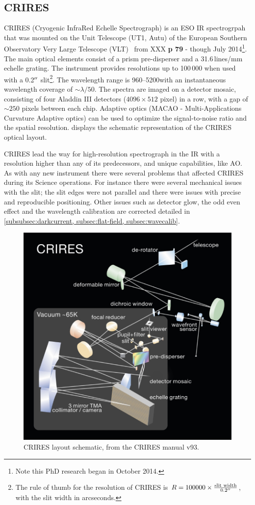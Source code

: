 \subsection{CRIRES}
CRIRES (Cryogenic InfraRed Echelle Spectrograph) is an ESO IR spectrogrpah that was mounted on the Unit Telescope (UT1, Autu) of the European Southern Observatory Very Large Telescope (VLT)~\citep{kaeufl 2004 } from XXX \textbf{p 79} - though July 2014\footnote{Note this PhD research began in October 2014.}.
The main optical elements consist of a prism pre-disperser and a 31.6\,lines/mm echelle grating.
The instrument provides resolutions up to 100\,000 when used with a 0.2$^{\prime\prime}$ slit\footnote{The rule of thumb for the resolution of CRIRES is \(R = 100000 \times \frac{\textrm{slit width}}{0.2^{\prime\prime}}\), with the slit width in arcseconds.}.
The wavelength range is 960--5200\nm with an instantaneous wavelength coverage of \(\sim \lambda/50\). The spectra are imaged on a detector mosaic, consisting of four Aladdin III detectors (\(4096 \times 512\) pixel) in a row, with a gap of \(\sim 250\) pixels between each chip.
Adaptive optics (MACAO - Multi-Applications Curvature Adaptive optics) can be used to optimize the signal-to-noise ratio and the spatial resolution.
 displays the schematic representation of the CRIRES optical layout.

CRIRES lead the way for high-resolution spectrograph in the IR with a resolution higher than any of its predecessors, and unique capabilities, like AO. As with any new instrument there were several problems that affected CRIRES during its Science operations. For instance there were several mechanical issues with the slit; the slit edges were not parallel and there were issues with precise and reproducible positioning. Other issues such as detector glow, the odd even effect and the wavelength calibration are corrected detailed in \cref{subsubsec:darkcurrent, subsec:flat-field, subsec:wavecalib}.


\begin{figure}
    \centering
    \includegraphics[width=0.7\linewidth]{figures/spectroscopy/CRIRES_schematic.pdf}
    \caption{CRIRES layout schematic, from the CRIRES manual v93.}
    \label{fig:criresschematic}
\end{figure}



